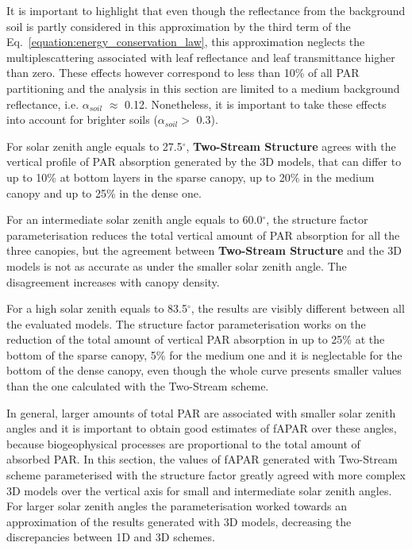 \documentclass[a4paper,11pt]{report}
\begin{document}
It is important to highlight that even though the reflectance from the background soil is partly considered in this approximation by the third term of the Eq.~\ref{equation:energy_conservation_law}, this approximation neglects the multiplescattering associated with leaf reflectance and leaf transmittance higher than zero. These effects however correspond to less than 10\% of all PAR partitioning and the analysis in this section are limited to a medium background reflectance, i.e. $\alpha_{soil}$ $\approx$ 0.12. Nonetheless, it is important to take these effects into account for brighter soils ($\alpha_{soil} >$ 0.3).

For solar zenith angle equals to 27.5$^{\circ}$, \textbf{Two-Stream Structure} agrees with the vertical profile of PAR absorption generated by the 3D models, that can differ to up to 10\% at bottom layers in the sparse canopy, up to 20\% in the medium canopy and up to 25\% in the dense one.

For an intermediate solar zenith angle equals to 60.0$^{\circ}$, the structure factor parameterisation reduces the total vertical amount of PAR absorption for all the three canopies, but the agreement between \textbf{Two-Stream Structure} and the 3D models is not as accurate as under the smaller solar zenith angle. The disagreement increases with canopy density.

For a high solar zenith equals to 83.5$^{\circ}$, the results are visibly different between all the evaluated models. The structure factor parameterisation works on the reduction of the total amount of vertical PAR absorption in up to 25\% at the bottom of the sparse canopy, 5\% for the medium one and it is neglectable for the bottom of the dense canopy, even though the whole curve presents smaller values than the one calculated with the Two-Stream scheme.

In general, larger amounts of total PAR are associated with smaller solar zenith angles and it is important to obtain good estimates of fAPAR over these angles, because biogeophysical processes are proportional to the total amount of absorbed PAR. In this section, the values of fAPAR generated with Two-Stream scheme parameterised with the structure factor greatly agreed with more complex 3D models over the vertical axis for small and intermediate solar zenith angles. For larger solar zenith angles the parameterisation worked towards an approximation of the results generated with 3D models, decreasing the discrepancies between  1D and 3D schemes.
\end{document}
